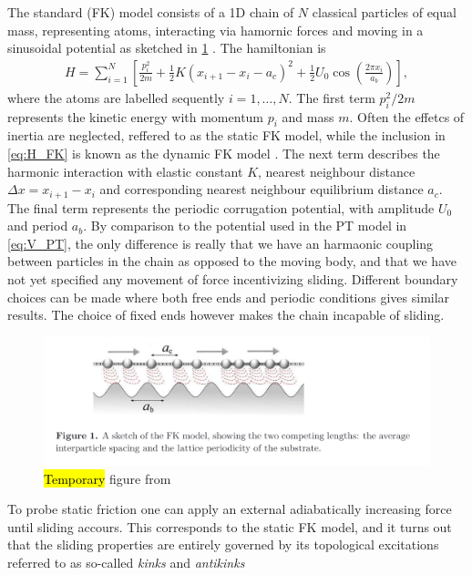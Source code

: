 The standard (\acrshort{FK}) model consists of a 1D chain of $N$ classical particles of equal mass, representing atoms, interacting via hamornic forces and moving in a sinusoidal potential as sketched in \cref{fig:FK_model} \cite{Manini_2016}. The hamiltonian is 
\begin{align}
  H = \sum_{i=1}^N \left[\frac{p_i^2}{2m} + \frac{1}{2}K(x_{i+1} - x_i - a_c)^2 + \frac{1}{2}U_0 \cos{\left(\frac{2\pi x_i}{a_b}\right)}\right],
  \label{eq:H_FK}
\end{align}
where the atoms are labelled sequently $i = 1, \hdots, N$. The first term $p_i^2/2m$ represents the kinetic energy with momentum $p_i$
and mass $m$. Often the effetcs of inertia are neglected, reffered to as the static \acrshort{FK} model, while the inclusion in \cref{eq:H_FK} is known as the dynamic \acrshort{FK} model \cite{FK2D}. The next term describes the harmonic interaction with elastic
constant $K$, nearest neighbour distance $\Delta x = x_{i+1} - x_i$ and 
corresponding nearest neighbour equilibrium distance $a_c$. The final term represents the periodic corrugation potential, with amplitude $U_0$ and period $a_b$. By comparison to the potential used in the \acrshort{PT} model in \cref{eq:V_PT}, the only difference is really that we have an harmaonic coupling between particles in the chain as opposed to the moving body, and that we have not yet specified any movement of force incentivizing sliding. Different boundary choices can be made where both free ends and periodic conditions gives similar results. The choice of fixed ends however makes the chain incapable of sliding.

\begin{figure}[H]
  \centering
  \includegraphics[width=0.8\linewidth]{figures/theory/FK_model.png}
  \caption{\hl{Temporary} figure from \cite{Manini_2016}}
  \label{fig:FK_model}
\end{figure}

To probe static friction one can apply an external adiabatically increasing force until sliding accours. This corresponds to the static \acrshort{FK} model, and it turns out that the sliding properties are entirely governed by its topological excitations referred to as so-called \textit{kinks} and \textit{antikinks}

